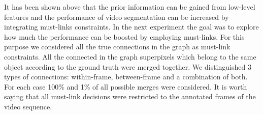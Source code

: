 It has been shown above that the prior information can be gained from low-level features and the performance of video segmentation can be increased by integrating must-links constraints.
In the next experiment the goal was to explore how much the performance can be boosted by employing must-links.
For this purpose we considered all the true connections in the graph as must-link constraints. All the connected in the graph superpixels which belong to the same object according to the ground truth were merged together.
We distinguished 3 types of connections: within-frame, between-frame and a combination of both. For each case 100\% and 1\% of all possible merges were considered. It is worth saying
that all must-link decisions were restricted to the annotated frames of the video sequence.

